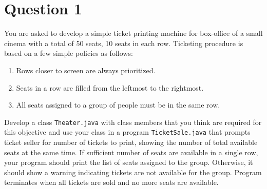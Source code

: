 \section*{Question 1}
You are asked to develop a simple ticket printing machine for box-office of a small cinema with a total of 50 seats, 10 seats in each row.
Ticketing procedure is based on a few simple policies as follows:

\begin{enumerate}[itemsep=-2mm,label={}]
  \item Rows closer to screen are always prioritized.
  \item Seats in a row are filled from the leftmost to the rightmost.
  \item All seats assigned to a group of people must be in the same row.
\end{enumerate}

Develop a class \texttt{Theater.java} with class members that you think are required for this objective and use your class in a program \texttt{TicketSale.java} that prompts ticket seller for number of tickets to print, showing the number of total available seats at the same time.
If sufficient number of seats are available in a single row, your program should print the list of seats assigned to the group.
Otherwise, it should show a warning indicating tickets are not available for the group.
Program terminates when all tickets are sold and no more seats are available.
